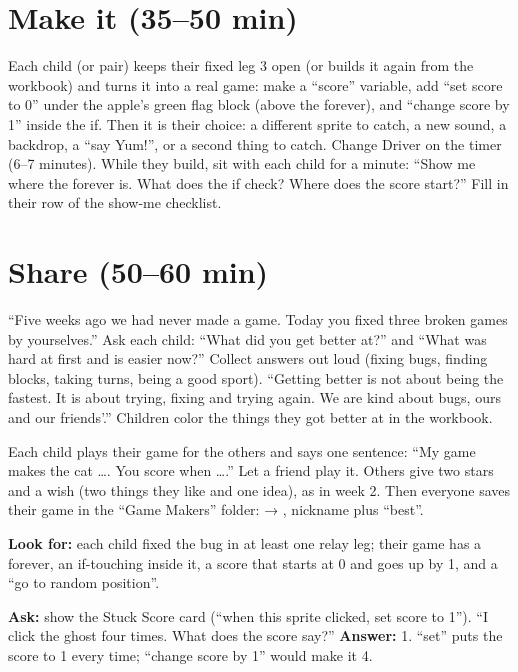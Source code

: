 \section{Make it (35--50 min)}
\begin{freebuild}
Each child (or pair) keeps their fixed leg 3 open (or builds it again from the workbook) and turns it into a real game: make a \enquote{score} variable, add \enquote{set score to 0} under the apple's green flag block (above the forever), and \enquote{change score by 1} inside the if. Then it is their choice: a different sprite to catch, a new sound, a backdrop, a \enquote{say Yum!}, or a second thing to catch. Change Driver on the timer (6--7 minutes). While they build, sit with each child for a minute: \enquote{Show me where the forever is. What does the if check? Where does the score start?} Fill in their row of the show-me checklist.
\end{freebuild}

\section{Share (50--60 min)}
\begin{safety}
\enquote{Five weeks ago we had never made a game. Today you fixed three broken games by yourselves.} Ask each child: \enquote{What did you get better at?} and \enquote{What was hard at first and is easier now?} Collect answers out loud (fixing bugs, finding blocks, taking turns, being a good sport). \enquote{Getting better is not about being the fastest. It is about trying, fixing and trying again. We are kind about bugs, ours and our friends'.} Children color the things they got better at in the workbook.
\end{safety}

\begin{teacherscript}
Each child plays their game for the others and says one sentence: \enquote{My game makes the cat \ldots. You score when \ldots.} Let a friend play it. Others give two stars and a wish (two things they like and one idea), as in week 2. Then everyone saves their game in the \enquote{Game Makers} folder:  → , nickname plus \enquote{best}.
\end{teacherscript}

\begin{formativecheck}
\textbf{Look for:} each child fixed the bug in at least one relay leg; their game has a forever, an if-touching inside it, a score that starts at 0 and goes up by 1, and a \enquote{go to random position}.

\textbf{Ask:} show the Stuck Score card (\enquote{when this sprite clicked, set score to 1}). \enquote{I click the ghost four times. What does the score say?}
\textbf{Answer:} 1. \enquote{set} puts the score to 1 every time; \enquote{change score by 1} would make it 4.
\end{formativecheck}

